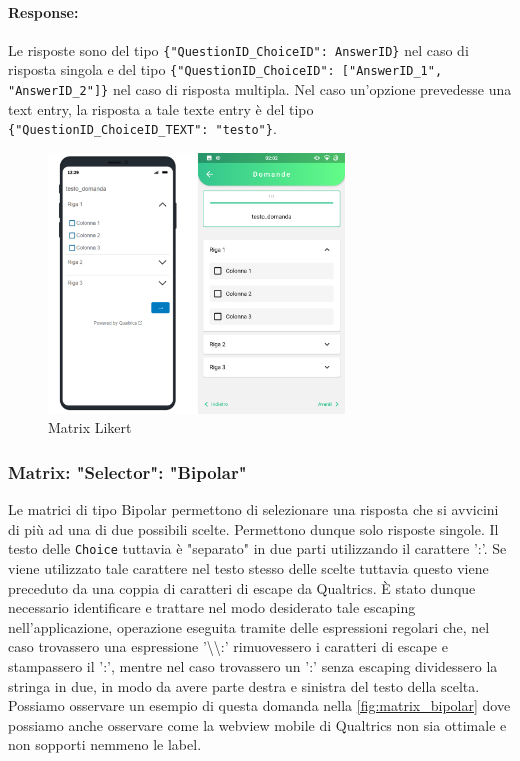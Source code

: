 \paragraph{Response:}
Le risposte sono del tipo \texttt{\{"QuestionID\_ChoiceID": AnswerID\}} nel caso di risposta singola e del tipo \texttt{\{"QuestionID\_ChoiceID": ["AnswerID\_1", "AnswerID\_2"]\}} nel caso di risposta multipla. Nel caso un'opzione prevedesse una text entry, la risposta a tale texte entry è del tipo \texttt{\{"QuestionID\_ChoiceID\_TEXT": "testo"\}}.

\begin{figure}[h!]
\centering
\includegraphics[width=0.7\textwidth]{img/matrix_likert}
\caption{Matrix Likert}
\label{fig:matrix_likert}
\end{figure}

\subsubsection{Matrix: "Selector": "Bipolar"}
Le matrici di tipo Bipolar permettono di selezionare una risposta che si avvicini di più ad una di due possibili scelte. Permettono dunque solo risposte singole. Il testo delle \texttt{Choice} tuttavia è "separato" in due parti utilizzando il carattere ':'. Se viene utilizzato tale carattere nel testo stesso delle scelte tuttavia questo viene preceduto da una coppia di caratteri di escape da Qualtrics. È stato dunque necessario identificare e trattare nel modo desiderato tale escaping nell'applicazione, operazione eseguita tramite delle espressioni regolari che, nel caso trovassero una espressione '\textbackslash\textbackslash:' rimuovessero i caratteri di escape e stampassero il ':', mentre nel caso trovassero un ':' senza escaping dividessero la stringa in due, in modo da avere parte destra e sinistra del testo della scelta. Possiamo osservare un esempio di questa domanda nella \autoref{fig:matrix_bipolar} dove possiamo anche osservare come la webview mobile di Qualtrics non sia ottimale e non sopporti nemmeno le label.

